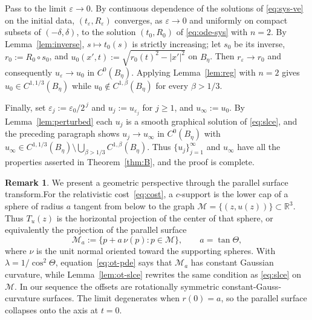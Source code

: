\documentclass[12pt,letterpaper]{amsart}
\theoremstyle{definition}
\newtheorem{remark}[definition]{Remark}
\theoremstyle{plain}
\numberwithin{equation}{section}
\newcommand{\R}{\mathbb{R}}
\newcommand{\ve}{\varepsilon}
\begin{document}
Pass to the limit $\varepsilon\to0$. By continuous dependence of the solutions of
\eqref{eq:sys-ve} on the initial data, $(t_\ve,R_\ve)$ converges, as $\varepsilon\to0$ and
uniformly on compact subsets of $(-\delta,\delta)$, to the solution $(t_0,R_0)$ of
\eqref{eq:ode-sys} with $n=2$. By Lemma~\ref{lem:inverse}, $s\mapsto t_0(s)$ is strictly
increasing; let $s_0$ be its inverse, $r_0:=R_0\circ s_0$, and
$u_0(x',t):=\sqrt{r_0(t)^2-|x'|^2}$ on $B_\eta$. Then $r_\ve\to r_0$ and consequently
$u_\ve\to u_0$ in $C^0(B_\eta)$. Applying Lemma~\ref{lem:reg} with $n=2$ gives
$u_0\in C^{1,1/3}(B_\eta)$ while $u_0\notin C^{1,\beta}(B_\eta)$ for every $\beta>1/3$.

Finally, set $\varepsilon_j:=\varepsilon_0/2^{\,j}$ and $u_j:=u_{\varepsilon_j}$ for $j\geq1$, and
$u_\infty:=u_0$. By Lemma~\ref{lem:perturbed} each $u_j$ is a smooth graphical solution of
\eqref{eq:slce}, and the preceding paragraph shows $u_j\to u_\infty$ in $C^0(B_\eta)$ with
$u_\infty\in C^{1,1/3}(B_\eta)\setminus\bigcup_{\beta>1/3}C^{1,\beta}(B_\eta)$. Thus
$\{u_j\}_{j=1}^\infty$ and $u_\infty$ have all the properties asserted in Theorem~\ref{thm:B},
and the proof is complete.

\begin{remark}
We present a geometric perspective through the parallel surface transform.\label{rk:geometry}
For the relativistic cost~\eqref{eq:cost}, a $c$-support is the lower cap of a sphere of
radius $a$ tangent from below to the graph
$\mathcal{M}=\{(z,u(z))\}\subset\R^3$. Thus $T_u(z)$ is the horizontal projection of the
center of that sphere, or equivalently the projection of the parallel surface
\[
    \mathcal{M}_a:=\{p+a\,\nu(p):p\in\mathcal{M}\},\qquad a=\tan\Theta,
\]
where $\nu$ is the unit normal oriented toward the supporting spheres. With
$\lambda=1/\cos^2\Theta$, equation~\eqref{eq:ot-pde} says that $\mathcal{M}_a$ has constant
Gaussian curvature, while Lemma~\ref{lem:ot-slce} rewrites the same condition as
\eqref{eq:slce} on $\mathcal{M}$. In our sequence the offsets are rotationally symmetric
constant-Gauss-curvature surfaces. The limit degenerates when $r(0)=a$, so the parallel surface
collapses onto the axis at $t=0$.
\end{remark}
\end{document}
